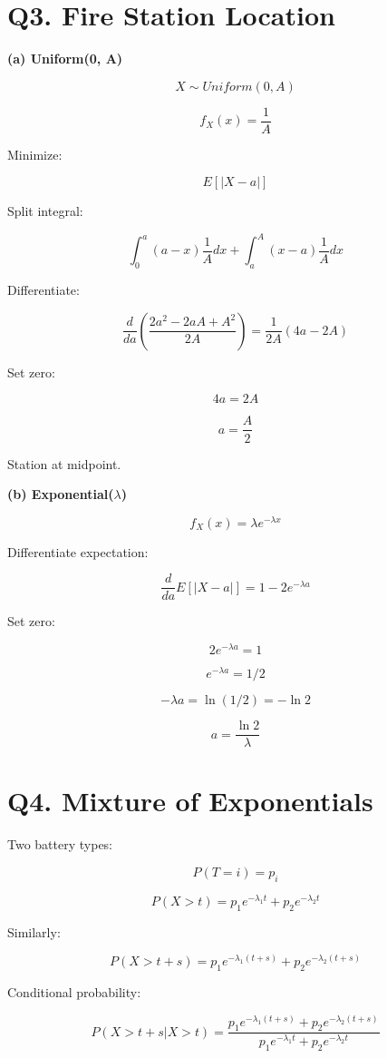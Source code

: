 \documentclass{article}
\begin{document}
\section*{Q3. Fire Station Location}

\textbf{(a) Uniform(0, A)}

\[
X \sim Uniform(0,A)
\]

\[
f_X(x) = \frac{1}{A}
\]

Minimize:

\[
E[|X-a|]
\]

Split integral:

\[
\int_0^a (a-x)\frac{1}{A}dx + \int_a^A (x-a)\frac{1}{A}dx
\]

Differentiate:

\[
\frac{d}{da}\left(\frac{2a^2 - 2aA + A^2}{2A}\right)
= \frac{1}{2A}(4a - 2A)
\]

Set zero:

\[
4a = 2A
\]

\[
a = \frac{A}{2}
\]

Station at midpoint.

\textbf{(b) Exponential($\lambda$)}

\[
f_X(x) = \lambda e^{-\lambda x}
\]

Differentiate expectation:

\[
\frac{d}{da}E[|X-a|] = 1 - 2e^{-\lambda a}
\]

Set zero:

\[
2e^{-\lambda a} = 1
\]

\[
e^{-\lambda a} = 1/2
\]

\[
-\lambda a = \ln(1/2) = -\ln 2
\]

\[
a = \frac{\ln 2}{\lambda}
\]

\section*{Q4. Mixture of Exponentials}

Two battery types:

\[
P(T=i) = p_i
\]

\[
P(X>t) = p_1 e^{-\lambda_1 t} + p_2 e^{-\lambda_2 t}
\]

Similarly:

\[
P(X>t+s) = p_1 e^{-\lambda_1 (t+s)} + p_2 e^{-\lambda_2 (t+s)}
\]

Conditional probability:

\[
P(X>t+s|X>t)
=
\frac{p_1 e^{-\lambda_1 (t+s)} + p_2 e^{-\lambda_2 (t+s)}}
{p_1 e^{-\lambda_1 t} + p_2 e^{-\lambda_2 t}}
\]
\end{document}
